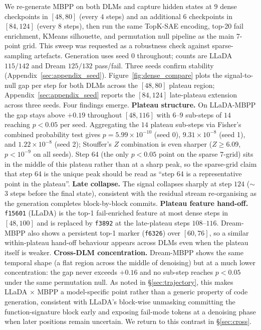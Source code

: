 \documentclass[11pt]{article}
\begin{document}
We re-generate MBPP on both DLMs and capture hidden states at $9$ dense checkpoints in $[48, 80]$ (every $4$ steps) and an additional $6$ checkpoints in $[84, 124]$ (every $8$ steps), then run the same TopK-SAE encoding, top-20 fail enrichment, KMeans silhouette, and permutation null pipeline as the main 7-point grid.
This sweep was requested as a robustness check against sparse-sampling artefacts.
Generation uses seed $0$ throughout; counts are LLaDA $115/142$ and Dream $125/132$ pass/fail. Three seeds confirm stability (Appendix~\ref{sec:appendix_seed}).
Figure~\ref{fig:dense_compare} plots the signal-to-null gap per step for both DLMs across the $[48,80]$ plateau region; Appendix~\ref{sec:appendix_seed} reports the $[84,124]$ late-plateau extension across three seeds.
Four findings emerge.
\textbf{Plateau structure.} On LLaDA-MBPP the gap stays above $+0.19$ throughout $[48, 116]$ with $6$--$9$ sub-steps of $14$ reaching $p\!<\!0.05$ per seed. Aggregating the $14$ plateau sub-steps via Fisher's combined probability test gives $p\!=\!5.99\!\times\!10^{-10}$ (seed 0), $9.31\!\times\!10^{-8}$ (seed 1), and $1.22\!\times\!10^{-8}$ (seed 2); Stouffer's $Z$ combination is even sharper ($Z\!\ge\!6.09$, $p\!<\!10^{-9}$ on all seeds). Step 64 (the only $p\!<\!0.05$ point on the sparse 7-grid) sits in the middle of this plateau rather than at a sharp peak, so the sparse-grid claim that step 64 is the unique peak should be read as ``step 64 is a representative point in the plateau''.
\textbf{Late collapse.} The signal collapses sharply at step $124$ ($\sim$$3$ steps before the final state), consistent with the residual stream re-organising as the generation completes block-by-block commits.
\textbf{Plateau feature hand-off.} \texttt{f15601} (LLaDA) is the top-1 fail-enriched feature at most dense steps in $[48, 100]$ and is replaced by \texttt{f3892} at the late-plateau steps $108$--$116$. Dream-MBPP also shows a persistent top-1 marker (\texttt{f6326}) over $[60, 76]$, so a similar within-plateau hand-off behaviour appears across DLMs even when the plateau itself is weaker.
\textbf{Cross-DLM concentration.} Dream-MBPP shows the same temporal shape (a flat region across the middle of denoising) but at a much lower concentration: the gap never exceeds $+0.16$ and no sub-step reaches $p\!<\!0.05$ under the same permutation null. As noted in \S\ref{sec:trajectory}, this makes LLaDA $\times$ MBPP a model-specific point rather than a generic property of code generation, consistent with LLaDA's block-wise unmasking committing the function-signature block early and exposing fail-mode tokens at a denoising phase when later positions remain uncertain. We return to this contrast in \S\ref{sec:cross}.
\end{document}

